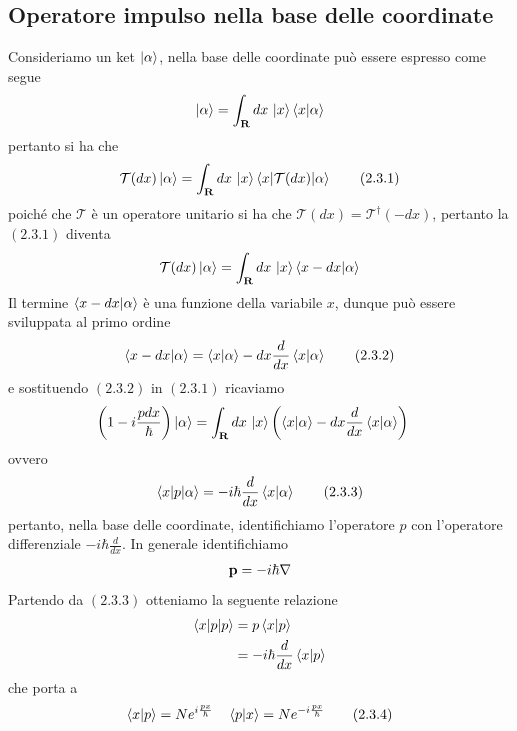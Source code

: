 \documentclass{article}
\begin{document}
\subsection{Operatore impulso nella base delle coordinate}
Consideriamo un ket $\ket{\alpha}$, nella base delle coordinate può essere espresso come segue
\begin{gather}
    \ket{\alpha} = \int_{\mathbf{R}} dx \, \ket{x}\braket{x|\alpha} \notag
\end{gather}
pertanto si ha che
\begin{align}
    \mathcal{T}(dx)\ket{\alpha} = \int_{\mathbf{R}} dx \, \ket{x}\braket{x|\mathcal{T}(dx)|\alpha} \tag{2.3.1}
\end{align}
poiché che $\mathcal{T}$ è un operatore unitario si ha che $\mathcal{T}(dx) = \mathcal{T}^\dagger(-dx)$, pertanto la $(2.3.1)$ diventa
\begin{gather}
    \mathcal{T}(dx)\ket{\alpha} = \int_{\mathbf{R}} dx \, \ket{x}\braket{x - dx|\alpha} \notag
\end{gather}
Il termine $\braket{x - dx|\alpha}$ è una funzione della variabile $x$, dunque può essere sviluppata al primo ordine
\begin{gather}
    \braket{x - dx|\alpha} = \braket{x|\alpha} -dx\frac{d}{dx}\braket{x|\alpha} \tag{2.3.2}
\end{gather}
e sostituendo $(2.3.2)$ in $(2.3.1)$ ricaviamo
\begin{align}
    \left( 1 - i\frac{p dx}{\hbar} \right) \ket{\alpha} &= \int_{\mathbf{R}} dx \, \ket{x} \left( \braket{x|\alpha} - dx\frac{d}{dx}\braket{x|\alpha} \right) \notag
\end{align}
ovvero
\begin{gather}
    \braket{x|p|\alpha} = -i\hbar \frac{d}{dx}\braket{x|\alpha} \tag{2.3.3}
\end{gather}
pertanto, nella base delle coordinate, identifichiamo l'operatore $p$ con l'operatore differenziale $-i\hbar \frac{d}{dx}$. In generale identifichiamo
\begin{gather}
    \mathbf{p} = -i\hbar \nabla \notag
\end{gather}
Partendo da $(2.3.3)$ otteniamo la seguente relazione
\begin{align}
    \braket{x|p|p} &= p\braket{x|p} \notag \\
    &= -i\hbar \frac{d}{dx} \braket{x|p} \notag
\end{align}
che porta a
\begin{gather}
    \braket{x|p} = Ne^{i\frac{px}{\hbar}} \quad \braket{p|x} = Ne^{-i\frac{px}{\hbar}} \tag{2.3.4}
\end{gather}
\end{document}

